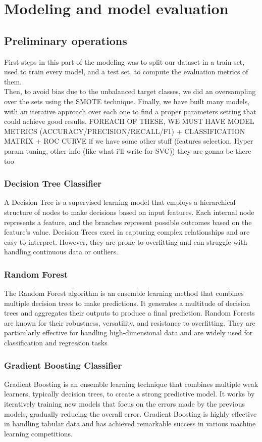 \chapter{Modeling and model evaluation}
\label{sec:data_preparation}

\section{Preliminary operations}
First steps in this part of the modeling was to split our dataset in a train set, used to train every model, and a test set, to compute the evaluation metrics of them.\\
Then, to avoid bias due to the unbalanced target classes, we did an oversampling over the sets using the SMOTE technique.
Finally, we have built many models, with an iterative approach over each one to find a proper parameters setting that could achieve good results.
FOREACH OF THESE, WE MUST HAVE MODEL METRICS (ACCURACY/PRECISION/RECALL/F1) + CLASSIFICATION MATRIX + ROC CURVE if we have some other stuff (features selection, Hyper param tuning, other info (like what i'll write for SVC)) they are gonna be there too
\subsection{Decision Tree Classifier}
A Decision Tree is a supervised learning model that employs a hierarchical structure of nodes to make decisions based on input features. Each internal node represents a feature, and the branches represent possible outcomes based on the feature's value. Decision Trees excel in capturing complex relationships and are easy to interpret. However, they are prone to overfitting and can struggle with handling continuous data or outliers.\subsection{Random Forest}
The Random Forest algorithm is an ensemble learning method that combines multiple decision trees to make predictions. It generates a multitude of decision trees and aggregates their outputs to produce a final prediction. Random Forests are known for their robustness, versatility, and resistance to overfitting. They are particularly effective for handling high-dimensional data and are widely used for classification and regression tasks
\subsection{Gradient Boosting Classifier}
Gradient Boosting is an ensemble learning technique that combines multiple weak learners, typically decision trees, to create a strong predictive model. It works by iteratively training new models that focus on the errors made by the previous models, gradually reducing the overall error. Gradient Boosting is highly effective in handling tabular data and has achieved remarkable success in various machine learning competitions.

